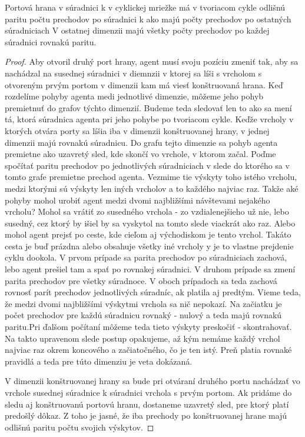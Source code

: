 \begin{lem}
Portová hrana v súradnici k v cyklickej mriežke má v tvoriacom cykle 
odlišnú paritu počtu prechodov po súradnici k ako majú počty prechodov 
po ostatných súradniciach
V ostatnej dimenzii majú všetky počty prechodov po každej súradnici 
rovnakú paritu.
\end{lem}
\begin{proof}
Aby otvoril druhý port hrany, agent musí svoju pozíciu zmeniť tak, 
aby sa nachádzal na susednej súradnici v diemnzii v ktorej sa líši s
vrcholom s otvoreným prvým portom v dimenzii kam má viesť konštruovaná hrana.
Keď rozdelíme pohyby agenta medi jednotlivé dimenzie, môžeme jeho pohyb
premietnuť do grafov týchto dimenzií. Budeme teda sledovať len to ako sa
mení tá, ktorá súradnica agenta pri jeho pohybe po tvoriacom cykle.
Keďže vrcholy v ktorých otvára porty sa líšia iba v dimenzii konštruovanej
hrany, v jednej dimenzii majú rovnakú súradnicu. Do grafu tejto dimenzie sa
pohyb agenta premietne ako uzavretý sled, kde skončí vo vrchole, v ktorom
začal.
Poďme spočítať paritu prechodov po jednotlivých súradniciach v slede do
ktorého sa v tomto grafe premietne prechod agenta.  Vezmime tie výskyty toho
istého vrcholu, medzi ktorými sú výskyty len iných vrcholov a to každého 
najviac raz. Takže aké pohyby mohol urobiť agent medzi dvomi najbližšími
návštevami nejakého vrcholu? Mohol sa vrátiť zo susedného vrchola - zo
vzdialenejšieho už nie, lebo susedný, cez ktorý by išiel by sa vyskytol na
tomto slede viackrát ako raz. 
Alebo mohol agent prejsť po ceste, kde cieľom
aj východiskom je tento vrchol. Takáto cesta je buď prázdna alebo obsahuje
všetky iné vrcholy y je to vlastne prejdenie cyklu dookola.
V prvom prípade sa parita prechodov po súradniciach zachová, lebo agent
prešiel tam a spať po rovnakej súradnici. V druhom prípade sa zmení parita
prechodov pre všetky súradnoce. V oboch prípadoch sa teda zachová rovnosť
parít prechodov jednotlivých súradníc, ak platila aj predtým. 
Vieme teda, že medzi dvomi najbližšími výskytmi vrchola sa nič nepokazí. Na
začiatku je počet prechodov pre každú súradnicu rovnaký - nulový a teda majú
rovnakú paritu.Pri ďalšom počítaní môžeme teda tieto výskyty preskočiť -
skontrahovať. Na takto upravenom slede postup opakujeme, až kým nemáme každý
vrchol najviac raz okrem koncového a začiatočného, čo je ten istý. Preň
platia rovnaké pravidlá a teda pre túto dimenziu je veta dokázaná.


V dimenzii konštruovanej hrany sa bude pri otváraní druhého portu nachádzať
vo vrchole susednej súradnice k súradnici vrchola s prvým portom.
Ak pridáme do sledu aj konštruovanú portovú hranu, dostaneme uzavretý sled, pre ktorý
platí predošlý dôkaz. Z toho je jasné, že iba prechody po konštruovanej
hrane majú odlišnú paritu počtu svojich výskytov.
\end{proof}


